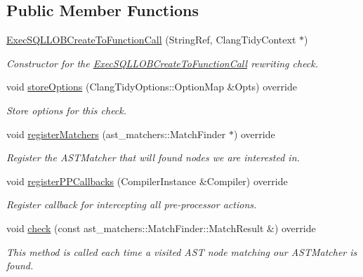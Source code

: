 \subsection*{Public Member Functions}
\begin{DoxyCompactItemize}
\item 
\hyperlink{classclang_1_1tidy_1_1pagesjaunes_1_1_exec_s_q_l_l_o_b_create_to_function_call_afe023bb4af1693a28a9de7978b9f9ccd}{Exec\+S\+Q\+L\+L\+O\+B\+Create\+To\+Function\+Call} (String\+Ref, Clang\+Tidy\+Context $\ast$)
\begin{DoxyCompactList}\small\item\em Constructor for the \hyperlink{classclang_1_1tidy_1_1pagesjaunes_1_1_exec_s_q_l_l_o_b_create_to_function_call}{Exec\+S\+Q\+L\+L\+O\+B\+Create\+To\+Function\+Call} rewriting check. \end{DoxyCompactList}\item 
void \hyperlink{classclang_1_1tidy_1_1pagesjaunes_1_1_exec_s_q_l_l_o_b_create_to_function_call_a931fda30319276176bcb68f0c912dbac}{store\+Options} (Clang\+Tidy\+Options\+::\+Option\+Map \&Opts) override
\begin{DoxyCompactList}\small\item\em Store options for this check. \end{DoxyCompactList}\item 
void \hyperlink{classclang_1_1tidy_1_1pagesjaunes_1_1_exec_s_q_l_l_o_b_create_to_function_call_aaab1c3eda2a4c120576ca88bc6f87912}{register\+Matchers} (ast\+\_\+matchers\+::\+Match\+Finder $\ast$) override
\begin{DoxyCompactList}\small\item\em Register the A\+S\+T\+Matcher that will found nodes we are interested in. \end{DoxyCompactList}\item 
void \hyperlink{classclang_1_1tidy_1_1pagesjaunes_1_1_exec_s_q_l_l_o_b_create_to_function_call_ab70058c9dd8607b7ba14f9de12b37b43}{register\+P\+P\+Callbacks} (Compiler\+Instance \&Compiler) override
\begin{DoxyCompactList}\small\item\em Register callback for intercepting all pre-\/processor actions. \end{DoxyCompactList}\item 
void \hyperlink{classclang_1_1tidy_1_1pagesjaunes_1_1_exec_s_q_l_l_o_b_create_to_function_call_a467bfebda1820296365c19c263ccea21}{check} (const ast\+\_\+matchers\+::\+Match\+Finder\+::\+Match\+Result \&) override
\begin{DoxyCompactList}\small\item\em This method is called each time a visited A\+ST node matching our A\+S\+T\+Matcher is found. \end{DoxyCompactList}\end{DoxyCompactItemize}
